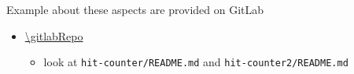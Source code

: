 \documentclass[presentation]{beamer}\mode<presentation>{\usetheme{AMSBolognaFC}}
\begin{document}
\begin{frame}[allowframebreaks]
    \bigskip

    \begin{exampleblock}{Example about these aspects are provided on GitLab}
        \begin{itemize}\small
            \item \url{\gitlabRepo}
            \begin{itemize}
                \item look at \texttt{hit-counter/README.md} and \texttt{hit-counter2/README.md} 
            \end{itemize}
        \end{itemize}
    \end{exampleblock}

\end{frame}





\end{document}
